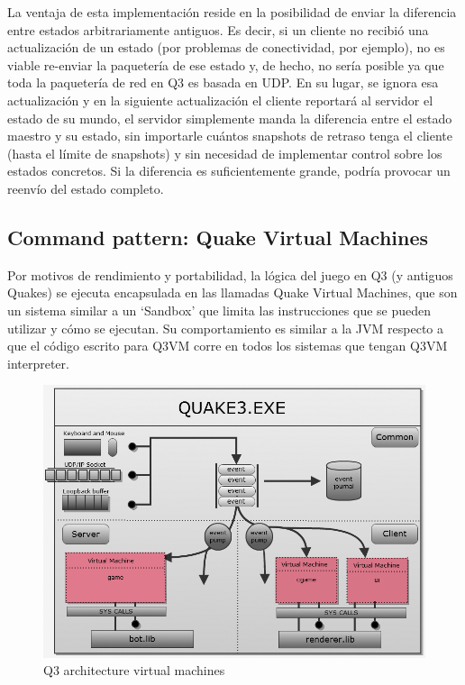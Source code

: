 \documentclass[a4paper,12pt]{report}
\begin{document}
	La ventaja de esta implementación reside en la posibilidad de enviar la diferencia entre estados arbitrariamente antiguos. Es decir, si un cliente no recibió una actualización de un estado (por problemas de conectividad, por ejemplo), no es viable re-enviar la paquetería de ese estado y, de hecho, no sería posible ya que toda la paquetería de red en Q3 es basada en UDP. En su lugar, se ignora esa actualización y en la siguiente actualización el cliente reportará al servidor el estado de su mundo, el servidor simplemente manda la diferencia entre el estado maestro y su estado, sin importarle cuántos snapshots de retraso tenga el cliente (hasta el límite de snapshots) y sin necesidad de implementar control sobre los estados concretos. Si la diferencia es suficientemente grande, podría provocar un reenvío del estado completo.
	

	\subsection{Command pattern: Quake Virtual Machines}
	
	Por motivos de rendimiento y portabilidad, la lógica del juego en Q3 (y antiguos Quakes) se ejecuta encapsulada en las llamadas Quake Virtual Machines, que son un sistema similar a un `Sandbox' que limita las instrucciones que se pueden utilizar y cómo se ejecutan. Su comportamiento es similar a la JVM respecto a que el código escrito para Q3VM corre en todos los sistemas que tengan Q3VM interpreter. \cite{q3vm}\\
	
	\begin{center}
		\begin{figure}[h]
			\includegraphics[width=1\textwidth]{images/q3_workspace_architecture}
			\caption{Q3 architecture virtual machines}
			\label{figq3vm}
		\end{figure}
	\end{center}
	
\end{document}
